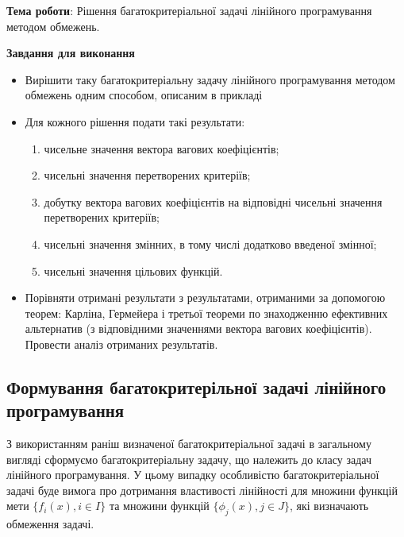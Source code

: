 


\newcommand{\labnumber}{4} %



\usepackage{systeme}
\usepackage{longtable,tabu}
\usepackage{multirow}
\usepackage{array,multirow}
\usepackage{pdflscape}
\usepackage{afterpage}
\usepackage{bm}

\graphicspath{{../figures/}}


\Ukrainian


\addtocounter{page}{1}

\textbf{Тема роботи}: Рішення багатокритеріальної задачі лінійного програмування методом обмежень.

\textbf{Завдання для виконання}
\begin{itemize}
	\item Вирішити таку багатокритеріальну задачу лінійного програмування методом обмежень одним способом, описаним в прикладі
	\item Для кожного рішення подати такі результати:
	\begin{enumerate}
		\item чисельне значення вектора вагових коефіцієнтів;
		\item чисельні значення перетворених критеріїв;
		\item добутку вектора вагових коефіцієнтів на відповідні чисельні значення перетворених критеріїв;
		\item чисельні значення змінних, в тому числі додатково введеної змінної;
		\item чисельні значення цільових функцій.
	\end{enumerate}
	\item Порівняти отримані результати з результатами, отриманими за допомогою теорем: Карліна, Гермейера і третьої теореми по знаходженню ефективних альтернатив (з відповідними значеннями вектора вагових коефіцієнтів). 
	Провести аналіз отриманих результатів.
\end{itemize}




\subsection{Формування багатокритерільної задачі лінійного програмування}

З використанням раніш визначеної багатокритеріальної задачі в загальному вигляді сформуємо багатокритеріальну задачу, що належить до класу задач лінійного програмування. 
У цьому випадку особливістю багатокритеріальної задачі буде вимога про дотримання властивості лінійності для множини функцій мети $\{ f_i(x), i \in I \}$
та множини функцій $\{ \phi_j(x), j \in J\}$, які визначають обмеження задачі.

